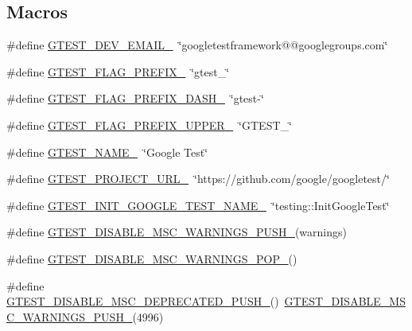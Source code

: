 \subsection*{Macros}
\begin{DoxyCompactItemize}
\item 
\#define \mbox{\hyperlink{gtest-port_8h_a21086d276b1a64d6763ee8a94b12c1b8}{G\+T\+E\+S\+T\+\_\+\+D\+E\+V\+\_\+\+E\+M\+A\+I\+L\+\_\+}}~\char`\"{}googletestframework@@googlegroups.\+com\char`\"{}
\item 
\#define \mbox{\hyperlink{gtest-port_8h_a088e84784c589ba9b1fc48602ad8eabf}{G\+T\+E\+S\+T\+\_\+\+F\+L\+A\+G\+\_\+\+P\+R\+E\+F\+I\+X\+\_\+}}~\char`\"{}gtest\+\_\+\char`\"{}
\item 
\#define \mbox{\hyperlink{gtest-port_8h_a4251ff898f9f94ec6b8b9402c3436759}{G\+T\+E\+S\+T\+\_\+\+F\+L\+A\+G\+\_\+\+P\+R\+E\+F\+I\+X\+\_\+\+D\+A\+S\+H\+\_\+}}~\char`\"{}gtest-\/\char`\"{}
\item 
\#define \mbox{\hyperlink{gtest-port_8h_a4018b7f288f974d022df397e2730633a}{G\+T\+E\+S\+T\+\_\+\+F\+L\+A\+G\+\_\+\+P\+R\+E\+F\+I\+X\+\_\+\+U\+P\+P\+E\+R\+\_\+}}~\char`\"{}G\+T\+E\+S\+T\+\_\+\char`\"{}
\item 
\#define \mbox{\hyperlink{gtest-port_8h_a13d98c217176bd8722c395b9225fc19d}{G\+T\+E\+S\+T\+\_\+\+N\+A\+M\+E\+\_\+}}~\char`\"{}Google Test\char`\"{}
\item 
\#define \mbox{\hyperlink{gtest-port_8h_a5aa3c938fc1d049f1d9c5332f6a0b1d4}{G\+T\+E\+S\+T\+\_\+\+P\+R\+O\+J\+E\+C\+T\+\_\+\+U\+R\+L\+\_\+}}~\char`\"{}https\+://github.\+com/google/googletest/\char`\"{}
\item 
\#define \mbox{\hyperlink{gtest-port_8h_aa5e27ad4f88278501ef71bd9ddbb44c6}{G\+T\+E\+S\+T\+\_\+\+I\+N\+I\+T\+\_\+\+G\+O\+O\+G\+L\+E\+\_\+\+T\+E\+S\+T\+\_\+\+N\+A\+M\+E\+\_\+}}~\char`\"{}testing\+::\+Init\+Google\+Test\char`\"{}
\item 
\#define \mbox{\hyperlink{gtest-port_8h_a86994cc68e844d8b82089c70408dfc61}{G\+T\+E\+S\+T\+\_\+\+D\+I\+S\+A\+B\+L\+E\+\_\+\+M\+S\+C\+\_\+\+W\+A\+R\+N\+I\+N\+G\+S\+\_\+\+P\+U\+S\+H\+\_\+}}(warnings)
\item 
\#define \mbox{\hyperlink{gtest-port_8h_ab4c44546d6d9aced68993b87b608fc06}{G\+T\+E\+S\+T\+\_\+\+D\+I\+S\+A\+B\+L\+E\+\_\+\+M\+S\+C\+\_\+\+W\+A\+R\+N\+I\+N\+G\+S\+\_\+\+P\+O\+P\+\_\+}}()
\item 
\#define \mbox{\hyperlink{gtest-port_8h_a5b130138db254deaf29dbe3dffa1a2a8}{G\+T\+E\+S\+T\+\_\+\+D\+I\+S\+A\+B\+L\+E\+\_\+\+M\+S\+C\+\_\+\+D\+E\+P\+R\+E\+C\+A\+T\+E\+D\+\_\+\+P\+U\+S\+H\+\_\+}}()~\mbox{\hyperlink{gtest-internal-inl_8h_a88f79832f9d045112a76e9da8611cc13}{G\+T\+E\+S\+T\+\_\+\+D\+I\+S\+A\+B\+L\+E\+\_\+\+M\+S\+C\+\_\+\+W\+A\+R\+N\+I\+N\+G\+S\+\_\+\+P\+U\+S\+H\+\_\+}}(4996)

\end{DoxyCompactItemize}
